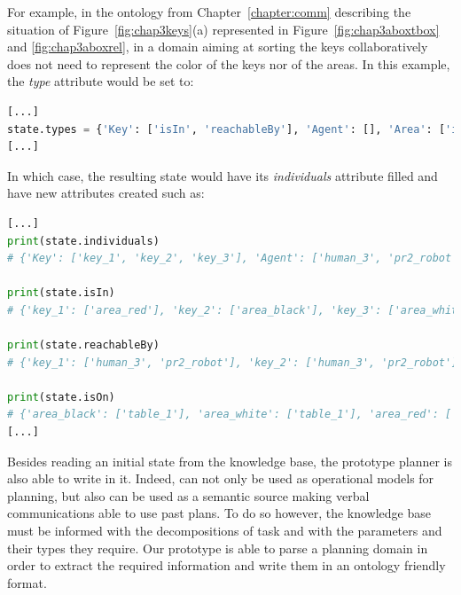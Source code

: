 \documentclass[a4paper,11pt,twoside]{StyleThese}
\begin{document}
For example, in the ontology from Chapter~\ref{chapter:comm} describing the situation of Figure~\ref{fig:chap3keys}(a) represented in Figure~\ref{fig:chap3aboxtbox} and \ref{fig:chap3aboxrel}, in a domain aiming at sorting the keys collaboratively does not need to represent the color of the keys nor of the areas. In this example, the \textit{type} attribute would be set to: 


\begin{lstlisting}[language=Python]
[...]
state.types = {'Key': ['isIn', 'reachableBy'], 'Agent': [], 'Area': ['isOn']}
[...]
\end{lstlisting}
In which case, the resulting state would have its \textit{individuals} attribute filled and have new attributes created such as:


\begin{lstlisting}[language=Python]
[...]
print(state.individuals)
# {'Key': ['key_1', 'key_2', 'key_3'], 'Agent': ['human_3', 'pr2_robot'], 'Area': ['area_black', 'area_white', 'area_red'], 'Table': ['table_1']}

print(state.isIn)
# {'key_1': ['area_red'], 'key_2': ['area_black'], 'key_3': ['area_white']}

print(state.reachableBy)
# {'key_1': ['human_3', 'pr2_robot'], 'key_2': ['human_3', 'pr2_robot'], 'key_3': ['human_3', 'pr2_robot']}

print(state.isOn)
# {'area_black': ['table_1'], 'area_white': ['table_1'], 'area_red': ['table_1']}
[...]
\end{lstlisting}


Besides reading an initial state from the knowledge base, the prototype planner is also able to write in it. Indeed,  can not only be used as operational models for planning, but also can be used as a semantic source making verbal communications able to use past plans. To do so however, the knowledge base must be informed with the decompositions of task and with the parameters and their types they require. Our prototype is able to parse a planning domain in order to extract the required information and write them in an ontology friendly format.
\end{document}
